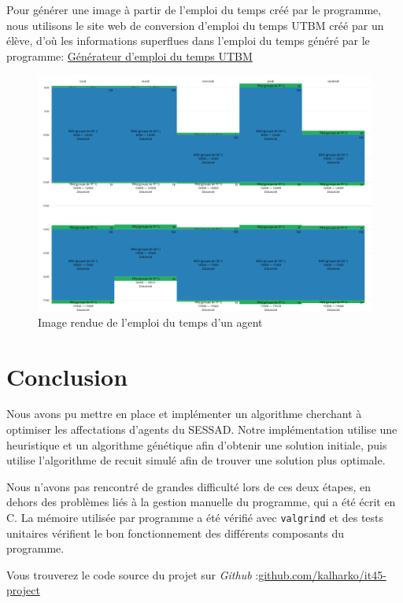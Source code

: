 \documentclass[11pt]{article}
\begin{document}
Pour générer une image à partir de l'emploi du temps créé par le programme, nous utilisons le site web de conversion d'emploi du temps UTBM créé par un élève, d'où les informations superflues dans l'emploi du temps généré par le programme: \href{https://codepen.io/TheRolf/full/gGbBoY?fbclid=IwAR0FcviTmRmV4PZjW4q8sscpVDDdAWsLMJvw682CjDEalOuPSbtQtzLUV24}{Générateur d'emploi du temps UTBM}


\begin{figure}[H]
    \centering
    \includegraphics[width=1\textwidth]{Images/edt.png}
    \caption{Image rendue de l'emploi du temps d'un agent}
    \label{fig:edt}
\end{figure}

\newpage
\section{Conclusion}

Nous avons pu mettre en place et implémenter un algorithme cherchant à optimiser les affectations d'agents du SESSAD.
Notre implémentation utilise une heuristique et un algorithme génétique afin d'obtenir une solution initiale, puis utilise l'algorithme de recuit simulé afin de trouver une solution plus optimale.

Nous n'avons pas rencontré de grandes difficulté lors de ces deux étapes, en dehors des problèmes liés à la gestion manuelle du programme, qui a été écrit en C.
La mémoire utilisée par programme a été vérifié avec \texttt{valgrind} et des tests unitaires vérifient le bon fonctionnement des différents composants du programme.

Vous trouverez le code source du projet sur \emph{Github} :\newline \href{https://github.com/kalharko/it45-project}{github.com/kalharko/it45-project}
\end{document}
